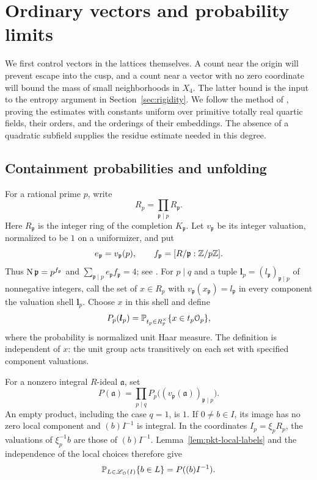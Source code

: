 \section{Ordinary vectors and probability limits}\label{sec:ordinary}

We first control vectors in the lattices themselves.  A count near the
origin will prevent escape into the cusp, and a count near a vector with
no zero coordinate will bound the mass of small neighborhoods in \(X_4\).
The latter bound is the input to the entropy argument in
Section~\ref{sec:rigidity}.  We follow the method of
\cite[Sections~2--5]{PrimeDegreePackets}, proving the estimates with
constants uniform over primitive totally real quartic fields, their orders,
and the orderings of their embeddings.  The absence of a quadratic
subfield supplies the residue estimate needed in this degree.

\subsection{Containment probabilities and unfolding}

For a rational prime \(p\), write
\[
 R_p=\prod_{\mathfrak p\mid p}R_{\mathfrak p}.
\]
Here \(R_{\mathfrak p}\) is the integer ring of the completion
\(K_{\mathfrak p}\).  Let \(v_{\mathfrak p}\) be its integer valuation,
normalized to be \(1\) on a uniformizer, and put
\[
 e_{\mathfrak p}=v_{\mathfrak p}(p),\qquad
 f_{\mathfrak p}=[R/\mathfrak p:\mathbb Z/p\mathbb Z].
\]
Thus \(\operatorname{N}\mathfrak p=p^{f_{\mathfrak p}}\) and
\(\sum_{\mathfrak p\mid p}e_{\mathfrak p}f_{\mathfrak p}=4\);
see \cite[Theorem~3.34]{MilneANT}.  For \(p\mid q\) and a tuple
\(\boldsymbol l_p=(l_{\mathfrak p})_{\mathfrak p\mid p}\) of
nonnegative integers, call the set of \(x\in R_p\) with
\(v_{\mathfrak p}(x_{\mathfrak p})=l_{\mathfrak p}\) in every component
the valuation shell \(\boldsymbol l_p\).  Choose \(x\) in this shell
and define
\begin{equation}\label{eq:ord-local-probability}
 P_p(\boldsymbol l_p)
   =\mathbb P_{t_p\in R_p^\times}\{x\in t_p\mathcal O_p\},
\end{equation}
where the probability is normalized unit Haar measure.  The definition
is independent of \(x\): the unit group acts transitively on each set
with specified component valuations.

For a nonzero integral \(R\)-ideal \(\mathfrak a\), set
\begin{equation}\label{eq:ord-ideal-weight}
 P(\mathfrak a)=
   \prod_{p\mid q}
   P_p\bigl((v_{\mathfrak p}(\mathfrak a))_{\mathfrak p\mid p}\bigr).
\end{equation}
An empty product, including the case \(q=1\), is \(1\).  If
\(0\ne b\in I\), its image has no zero local component and
\((b)I^{-1}\) is integral.  In the coordinates
\(I_p=\xi_pR_p\), the valuations of \(\xi_p^{-1}b\) are those of
\((b)I^{-1}\).  Lemma~\ref{lem:pkt-local-labels} and the independence
of the local choices therefore give
\begin{equation}\label{eq:ord-membership}
 \mathbb P_{L\in\mathscr L_{\mathcal O}(I)}\{b\in L\}
       =P((b)I^{-1}).
\end{equation}

